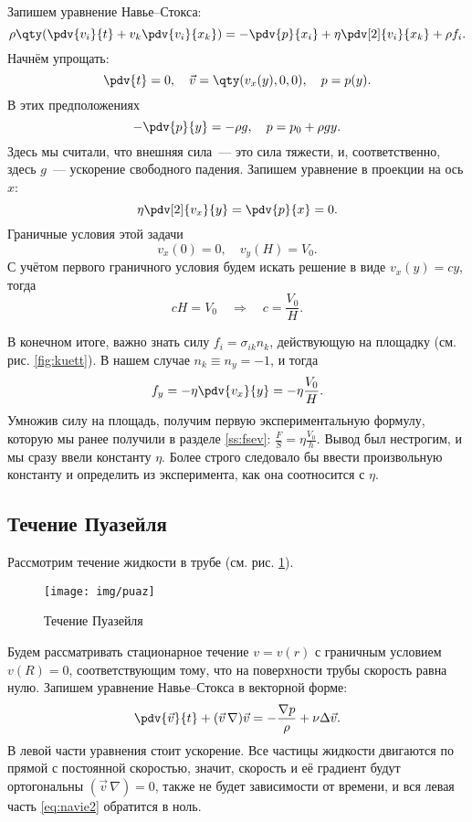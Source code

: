Запишем уравнение Навье--Стокса:
\begin{equation}
    \rho\qty(
        \pdv{v_i}{t}+v_k\pdv{v_i}{x_k}
    )=
    -\pdv{p}{x_i}+\eta\pdv[2]{v_i}{x_k}+\rho f_i.
\end{equation}
Начнём упрощать:
\begin{equation}
    \pdv{t} = 0,\quad
    \vec{v} = \qty(v_x (y),0,0), \quad
    p = p(y).
\end{equation}
В этих предположениях
\begin{equation}
    -\pdv{p}{y} = -\rho g, \quad
    p = p_0 + \rho g y.
\end{equation}
Здесь мы считали, что внешняя сила~--- это сила тяжести, и, соответственно, здесь $g$~--- ускорение свободного падения. Запишем уравнение в проекции на ось $x$:
\begin{equation}
    \eta\pdv[2]{v_x}{y} = \pdv{p}{x} = 0.
\end{equation}
Граничные условия этой задачи
\begin{equation}
    v_x (0) = 0, \quad
    v_y (H) = V_0.
\end{equation}
С учётом первого граничного условия будем искать решение в виде \mbox{$v_x(y) = cy$}, тогда
\begin{equation}
    cH = V_0 \quad \Rightarrow \quad c= \frac{V_0}{H}.
\end{equation}

В конечном итоге, важно знать силу $f_i = \sigma_{ik} n_k$, действующую на площадку (см. рис. \ref{fig:kuett}). В нашем случае $n_k \equiv n_y = -1$, и тогда
\begin{equation}
    f_y = -\eta \pdv{v_x}{y}= -\eta \frac{V_0}{H}.
\end{equation}
Умножив силу на площадь, получим первую экспериментальную формулу, которую мы ранее получили в разделе \ref{ss:fsev}: $\frac{F}{S} = \eta \frac{V_0}{h}$. Вывод был нестрогим, и мы сразу ввели константу $\eta$. Более строго следовало бы ввести произвольную константу и определить из эксперимента, как она соотносится с $\eta$.
\subsection{Течение Пуазейля}
Рассмотрим течение жидкости в трубе (см. рис. \ref{fig:puaseil_tech}).
\begin{figure}[H]
    \centering
    \texttt{[image: img/puaz]}
    \caption{Течение Пуазейля}
    \label{fig:puaseil_tech}
\end{figure}
Будем рассматривать стационарное течение $v = v(r)$  с граничным условием $v(R)=0$,  соответствующим тому, что на поверхности трубы скорость равна нулю.
Запишем уравнение Навье--Стокса в векторной форме:
\begin{equation}
    \label{eq:navie2}
    \pdv{\vec{v}}{t}+(\vec{v}\,\nabla)\vec{v} =
    - \frac{\nabla p}{\rho}+\nu \Delta \vec{v}.
\end{equation}
В левой части уравнения стоит ускорение. Все частицы жидкости двигаются по прямой с постоянной скоростью, значит, скорость и её градиент будут ортогональны $(\vec{v}\,\nabla)=0$, также не будет зависимости от времени, и вся левая часть \eqref{eq:navie2} обратится в ноль.

